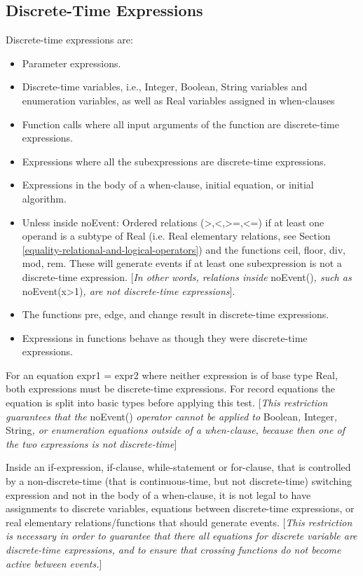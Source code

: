 \documentclass[10pt,a4paper]{report}
\def\Mcomment#1{{[}\emph{#1}{]}}
\def\doublelabel#1{\label{#1}\hypertarget{#1}{}}
\begin{document}
\subsection{Discrete-Time Expressions}\doublelabel{discrete-time-expressions}
Discrete-time expressions are:

\begin{itemize}
\item
  Parameter expressions.
\item
  Discrete-time variables, i.e., Integer, Boolean, String variables and
  enumeration variables, as well as Real variables assigned in
  when-clauses
\item
  Function calls where all input arguments of the function are
  discrete-time expressions.
\item
  Expressions where all the subexpressions are discrete-time
  expressions.
\item
  Expressions in the body of a when-clause, initial equation, or initial
  algorithm.
\item
  Unless inside noEvent: Ordered relations
  (\textgreater{},\textless{},\textgreater{}=,\textless{}=) if at least
  one operand is a subtype of Real (i.e. Real elementary relations, see
  Section \ref{equality-relational-and-logical-operators}) and the functions ceil, floor, div, mod, rem. These will
  generate events if at least one subexpression is not a discrete-time
  expression. {[}\emph{In other words, relations inside}
  noEvent()\emph{, such as} noEvent(x\textgreater{}1)\emph{, are not
  discrete-time expressions}{]}.
\item
  The functions pre, edge, and change result in discrete-time
  expressions.
\item
  Expressions in functions behave as though they were discrete-time
  expressions.
\end{itemize}

For an equation expr1 = expr2 where neither expression is of base type
Real, both expressions must be discrete-time expressions. For record
equations the equation is split into basic types before applying this
test. {[}\emph{This restriction guarantees that the} noEvent()
\emph{operator cannot be applied to} Boolean\emph{,} Integer\emph{,}
String\emph{, or enumeration equations outside of a when-clause, because
then one of the two expressions is not discrete-time}{]}

Inside an if-expression, if-clause, while-statement or for-clause, that
is controlled by a non-discrete-time (that is continuous-time, but not
discrete-time) switching expression and not in the body of a
when-clause, it is not legal to have assignments to discrete variables,
equations between discrete-time expressions, or real elementary
relations/functions that should generate events. \Mcomment{This
restriction is necessary in order to guarantee that there all equations
for discrete variable are discrete-time expressions, and to ensure that
crossing functions do not become active between events.}
\end{document}
